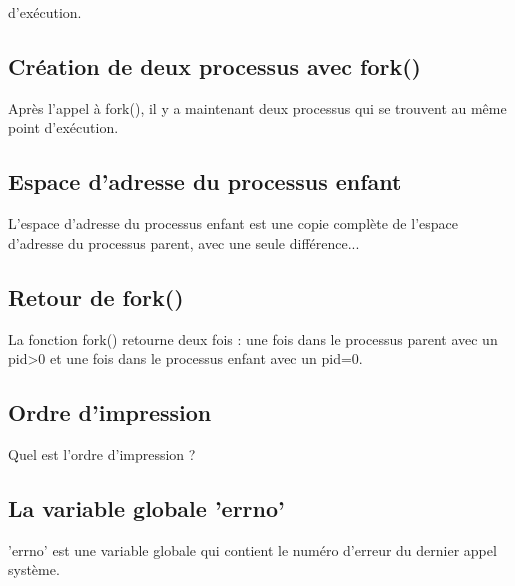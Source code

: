 \documentclass[12pt]{report}
\begin{document}
d'exécution. \subsection{Création de deux processus avec fork()}Après l'appel à fork(), il y a maintenant deux processus qui se trouvent au même point d'exécution. \subsection{Espace d'adresse du processus enfant}L'espace d'adresse du processus enfant est une copie complète de l'espace d'adresse du processus parent, avec une seule différence... \subsection{Retour de fork()}La fonction fork() retourne deux fois : une fois dans le processus parent avec un pid>0 et une fois dans le processus enfant avec un pid=0. \subsection{Ordre d'impression}Quel est l'ordre d'impression ? \subsection{La variable globale 'errno'}'errno' est une variable globale qui contient le numéro d'erreur du dernier appel système. 
\end{document}
